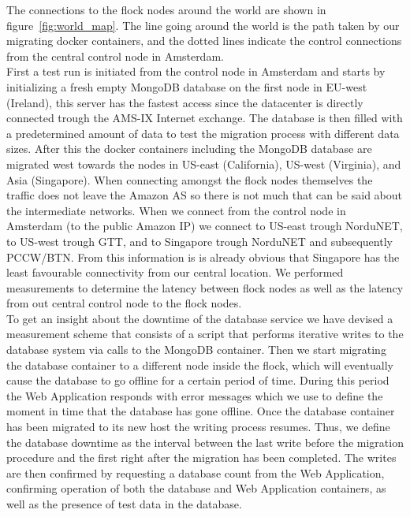 \documentclass{article}
\begin{document}
The connections to the flock nodes around the world are shown in figure~\ref{fig:world_map}. The line going around the world is the path taken by our migrating docker containers, and the dotted lines indicate the control connections from the central control node in Amsterdam. \\
First a test run is initiated from the control node in Amsterdam and starts by initializing a fresh empty MongoDB database on the first node in EU-west (Ireland), this server has the fastest access since the datacenter is directly connected trough the AMS-IX Internet exchange. The database is then filled with a predetermined amount of data to test the migration process with different data sizes. After this the docker containers including the MongoDB database are migrated west towards the nodes in US-east (California), US-west (Virginia), and Asia (Singapore). When connecting amongst the flock nodes themselves the traffic does not leave the Amazon AS so there is not much that can be said about the intermediate networks. When we connect from the control node in Amsterdam (to the public Amazon IP) we connect to US-east trough NorduNET, to US-west trough GTT, and to Singapore trough NorduNET and subsequently PCCW/BTN. From this information is is already obvious that Singapore has the least favourable connectivity from our central location. We performed measurements to determine the latency between flock nodes as well as the latency from out central control node to the flock nodes.\\
To get an insight about the downtime of the database service we have devised a measurement scheme that consists of a script that performs iterative writes to the database system via calls to the MongoDB container. Then we start migrating the database container to a different node inside the flock, which will eventually cause the database to go offline for a certain period of time. During this period the Web Application responds with error messages which we use to define the moment in time that the database has gone offline. Once the database container has been migrated to its new host the writing process resumes. Thus, we define the database downtime as the interval between the last write before the migration procedure and the first right after the migration has been completed. The writes are then confirmed by requesting a database count from the Web Application, confirming operation of both the database and Web Application containers, as well as the presence of test data in the database.
\end{document}
